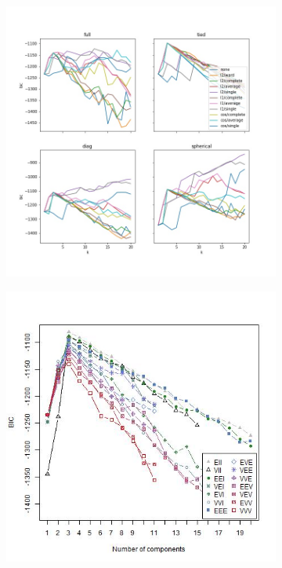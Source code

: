 \documentclass{article}
\begin{document}
\begin{figure}[h!]
\centering
\begin{subfigure}[b]{0.35\linewidth}
  \includegraphics[width=\linewidth]{lowd_python_bicplot.jpg}
\caption{}
\end{subfigure}
\begin{subfigure}[b]{0.35\linewidth}
  \includegraphics[width=\linewidth]{lowd_r_bicplot.jpg}

\end{subfigure}
\end{figure}
\end{document}

